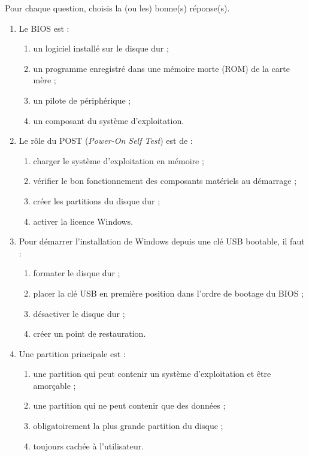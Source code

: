 \documentclass[11pt]{article}
\begin{document}
\begin{exercice}
Pour chaque question, choisis la (ou les) bonne(s) réponse(s).
\begin{enumerate}
\item Le BIOS est :
\begin{enumerate}
\item un logiciel installé sur le disque dur ;
\item un programme enregistré dans une mémoire morte (ROM) de la carte mère ;
\item un pilote de périphérique ;
\item un composant du système d'exploitation.
\end{enumerate}
\item Le rôle du POST (\emph{Power-On Self Test}) est de :
\begin{enumerate}
\item charger le système d'exploitation en mémoire ;
\item vérifier le bon fonctionnement des composants matériels au démarrage ;
\item créer les partitions du disque dur ;
\item activer la licence Windows.
\end{enumerate}
\item Pour démarrer l'installation de Windows depuis une clé USB bootable, il faut :
\begin{enumerate}
\item formater le disque dur ;
\item placer la clé USB en première position dans l'ordre de bootage du BIOS ;
\item désactiver le disque dur ;
\item créer un point de restauration.
\end{enumerate}
\item Une partition principale est :
\begin{enumerate}
\item une partition qui peut contenir un système d'exploitation et être amorçable ;
\item une partition qui ne peut contenir que des données ;
\item obligatoirement la plus grande partition du disque ;
\item toujours cachée à l'utilisateur.
\end{enumerate}
\end{enumerate}
\end{exercice}
\end{document}
